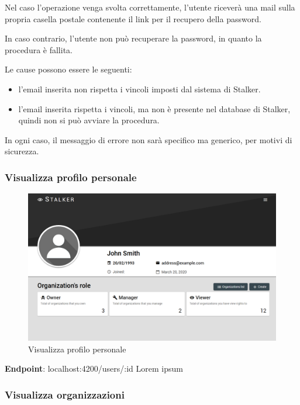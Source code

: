 \documentclass[../manuale-utente.tex]{subfiles}
\begin{document}
Nel caso l'operazione venga svolta correttamente, l'utente riceverà una mail sulla propria casella postale contenente il link per il recupero della password.

In caso contrario, l'utente non può recuperare la password, in quanto la procedura è fallita.

Le cause possono essere le seguenti:
\begin{itemize}
    \item l'email inserita non rispetta i vincoli imposti dal sistema di Stalker.
    \item l'email inserita rispetta i vincoli, ma non è presente nel database di Stalker, quindi non si può avviare la procedura.
\end{itemize}

In ogni caso, il messaggio di errore non sarà specifico ma generico, per motivi di sicurezza.
\newpage

\subsubsection{Visualizza profilo personale}%
\label{subs:visualizza-profilo-personale}

\begin{figure}[H]
    \centering
    \includegraphics[width=120mm]{img/web-app/visualizza-profilo-personale.PNG}
    \caption{Visualizza profilo personale}%
    \label{fig:web-app-visualizza-profilo-personale}
\end{figure}

\textbf{Endpoint}: localhost:4200/users/:id
Lorem ipsum
\newpage

\subsubsection{Visualizza organizzazioni}%
\label{subs:visualizza-organizzazioni}
\end{document}
